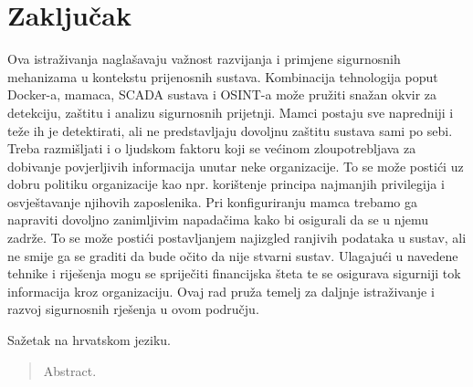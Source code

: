 \documentclass[times, utf8, zavrsni]{fer}
\begin{document}
\chapter{Zaključak}
Ova istraživanja naglašavaju važnost razvijanja i primjene sigurnosnih mehanizama u kontekstu prijenosnih sustava. Kombinacija tehnologija poput Docker-a, mamaca, SCADA sustava i OSINT-a može pružiti snažan okvir za detekciju, zaštitu i analizu sigurnosnih prijetnji. Mamci postaju sve napredniji i teže ih je detektirati, ali ne predstavljaju dovoljnu zaštitu sustava sami po sebi. Treba razmišljati i o ljudskom faktoru koji se većinom zloupotrebljava za dobivanje povjerljivih informacija unutar neke organizacije. To se može postići uz dobru politiku organizacije kao npr. korištenje principa najmanjih privilegija i osvještavanje njihovih zaposlenika. Pri konfiguriranju mamca trebamo ga napraviti dovoljno zanimljivim napadačima kako bi osigurali da se u njemu zadrže. To se može postići postavljanjem najizgled ranjivih podataka u sustav, ali ne smije ga se graditi da bude očito da nije stvarni sustav. Ulagajući u navedene tehnike i riješenja mogu se spriječiti financijska šteta te se osigurava sigurniji tok informacija kroz organizaciju. Ovaj rad pruža temelj za daljnje istraživanje i razvoj sigurnosnih rješenja u ovom području.



\begin{sazetak}
Sažetak na hrvatskom jeziku.


\end{sazetak}

\begin{abstract}
Abstract.


\end{abstract}
\end{document}

